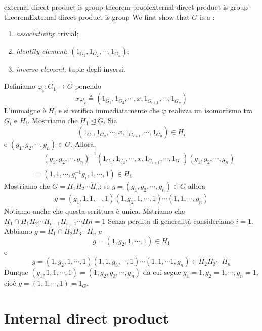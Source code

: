 \documentclass[preview]{standalone}
\begin{document}
\begin{snippetproof}{external-direct-product-is-group-theorem-proof}{external-direct-product-is-group-theorem}{External direct product is group}
    We first show that \(G\) is a \group:
    \begin{enumerate}
        \item \emph{associativity}: trivial;
        \item \emph{identity element}: \((1_{G_1}, 1_{G_2}, \cdots, 1_{G_n})\);
        \item \emph{inverse element}: tuple degli inversi.
    \end{enumerate}
    Definiamo \(\varphi_i \colon G_1 \to G\) ponendo
    \[
        x\varphi_i \triangleq
        (1_{G_1}, 1_{G_2}, \cdots, x, 1_{G_{i+1}}, \cdots, 1_{G_n})
    \]
    L'immaigne è \(H_i\) e si verifica immediatamente che \(\varphi\)
    realizza un isomorfismo tra \(G_i\) e \(H_i\).
    Mostriamo che \(H_1 \unlhd G\). Sia
    \[
        (1_{G_1}, 1_{G_2}, \cdots, x, 1_{G_{i+1}}, \cdots, 1_{G_n}) \in H_i
    \]
    e \((g_1, g_2, \cdots, g_n) \in G\).
    Allora,
    \begin{align*}
        &\phantom{=}
        {(g_1, g_2, \cdots, g_n)}^{-1} (1_{G_1}, 1_{G_2}, \cdots, x, 1_{G_{i+1}}, \cdots, 1_{G_n})
        (g_1, g_2, \cdots, g_n) \\
        &= (1, 1, \cdots, g_i^{-1} g_i, 1, \cdots, 1) \in H_i
    \end{align*}
    Mostriamo che \(G = H_1 H_2 \cdots H_n\):
    se \(g = (g_1, g_2, \cdots, g_n) \in G\) allora
    \begin{align*}
        g = (g_1, 1, 1, \cdots, 1) (1, g_2, 1, \cdots, 1) \cdots (1,1,\cdots, g_n)
    \end{align*}
    Notiamo anche che questa scrittura è unica.
    Mstriamo che \(H_1 \cap H_1H_2\cdots H_{i-1} H_{i+1} \cdots Hn = 1\)
    Senza perdita di generalità consideriamo \(i=1\).
    Abbiamo \(g = H_1 \cap H_2 H_3 \cdots H_n\) e
    \[
        g = (1, g_2, 1, \cdots, 1) \in H_1
    \]
    e
    \[
        g = (1, g_2, 1, \cdots, 1)(1,1,g_3, \cdots, 1) \cdots (1,1,\cdots 1, g_n) \in H_2H_3\cdots H_n
    \]
    Dunque
    \((g_1, 1, 1, \cdots, 1) = (1, g_2, g_3, \cdots, g_n)\)
    da cui segue \(g_1 = 1, g_2 = 1, \cdots, g_n = 1\), cioè \(g = (1,1,\cdots, 1) = 1_G\).
\end{snippetproof}

\section{Internal direct product}
\end{document}

